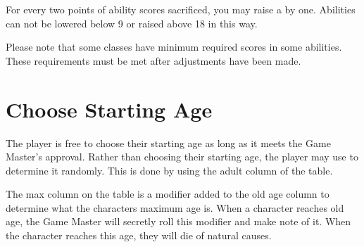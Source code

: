 \begin{multicols*}{2}
For every two points of ability scores sacrificed, you may raise a  by one. Abilities can not be lowered below 9 or raised above 18 in this way.

Please note that some classes have minimum required scores in some abilities. These requirements must be met after adjustments have been made.


\section{Choose Starting Age}
The player is free to choose their starting age as long as it meets the Game Master's approval. Rather than choosing their starting age, the player may use  to determine it randomly. This is done by using the adult column of the table. 

The max column on the table is a modifier added to the old age column to determine what the characters maximum age is. When a character reaches old age, the Game Master will secretly roll this modifier and make note of it. When the character reaches this age, they will die of natural causes.


\end{multicols*}
